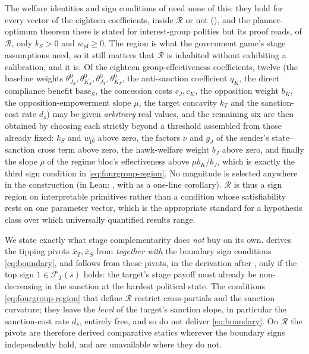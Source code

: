 The welfare identities and sign conditions of 
need none of this: they hold for every vector of the eighteen coefficients,
inside $\mathcal R$ or not (), and the planner-optimum
theorem there is stated for interest-group polities but its proof reads, of
$\mathcal R$, only $k_S>0$ and $w_{\mathrm{pl}}\ge0$. The region is what the
government game's stage assumptions need, so it still matters that $\mathcal R$
is inhabited without exhibiting a calibration, and it is. Of the eighteen
group-effectiveness coefficients, twelve (the baseline weights
$\theta^0_{J_S},\theta^0_{K_S},\theta^0_{J_T},\theta^0_{K_T}$, the
anti-sanction coefficient $q_K$, the direct compliance benefit
$\mathrm{base}_S$, the concession costs $c_J,c_K$, the opposition weight
$b_K$, the opposition-empowerment slope $\mu$, the target concavity $k_T$
and the sanction-cost rate $d_s$) may be given \emph{arbitrary} real
values, and the remaining six are then obtained by choosing each strictly
beyond a threshold assembled from those already fixed: $k_S$ and
$w_{\mathrm{pl}}$ above zero, the factors $\nu$ and $g_J$ of the sender's
state--sanction cross term above zero, the hawk-welfare weight $b_J$ above zero, and finally
the slope $\rho$ of the regime bloc's effectiveness above $\mu b_K/b_J$, which is exactly the third
sign condition in \eqref{eq:fourgroup-region}. No
magnitude is selected anywhere in the construction (in Lean:
, with  as a
one-line corollary). $\mathcal R$ is thus a sign region on interpretable
primitives rather than a condition whose satisfiability rests on one
parameter vector, which is the appropriate standard for a hypothesis
class over which universally quantified results range.

We state exactly what stage complementarity does \emph{not}
buy on its own.  derives the tipping pivots
$\bar x_T,\bar x_S$ from  \emph{together with} the
boundary sign conditions \eqref{eq:boundary}, and
 follows from those pivots, in the derivation after
, only if the top sign $1\in\mathcal F_T(\bar s)$ holds: the target's stage
payoff must already be non-decreasing in the sanction at the hardest
political state. The conditions \eqref{eq:fourgroup-region} that define
$\mathcal R$ restrict cross-partials and the sanction curvature; they
leave the \emph{level} of the target's sanction slope, in particular
the sanction-cost rate $d_s$, entirely free, and so do not deliver
\eqref{eq:boundary}. On $\mathcal R$ the pivots are therefore derived
comparative statics wherever the boundary signs independently hold, and
are unavailable where they do not.

